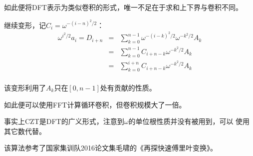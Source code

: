 如此便将DFT表示为类似卷积的形式，唯一不足在于求和上下界与卷积不同。

继续变形，记$C_i=\omega^{-(i-n)^2/2}$：
\begin{eqnarray*}
    \omega^{i^2/2}a_i=D_{i+n}&=&\sum_{k=0}^{n-1}{\omega^{-(i-k)^2/2}\omega^{-k^2/2}A_k}\\
    &=&\sum_{k=0}^{n-1}{C_{i+n-k}\omega^{-k^2/2}A_k}\\
    &=&\sum_{k=0}^{i+n}{C_{i+n-k}\omega^{-k^2/2}A_k}\\
\end{eqnarray*}

该变形利用了$A_k$只在$[0,n-1]$处有贡献的性质。

如此便可以使用FFT计算循环卷积，但卷积规模大了一倍。

事实上CZT是DFT的广义形式，注意到$\omega$的单位根性质并没有被用到，可以
使用其它数代替。

该算法参考了国家集训队2016论文集毛啸的《再探快速傅里叶变换》。
